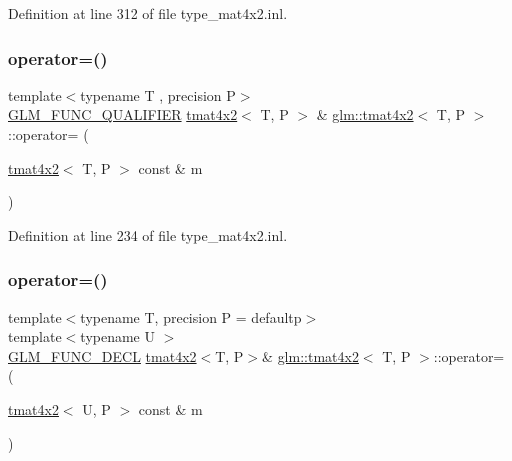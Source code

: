 Definition at line 312 of file type\+\_\+mat4x2.\+inl.

\mbox{\label{structglm_1_1tmat4x2_a46c78cffbef2b6300349830a76cb6372}} 
\subsubsection{\texorpdfstring{operator=()}{operator=()}\hspace{0.1cm}{\footnotesize\ttfamily [1/3]}}
{\footnotesize\ttfamily template$<$typename T , precision P$>$ \\
\mbox{\hyperlink{setup_8hpp_a33fdea6f91c5f834105f7415e2a64407}{G\+L\+M\+\_\+\+F\+U\+N\+C\+\_\+\+Q\+U\+A\+L\+I\+F\+I\+ER}} \mbox{\hyperlink{structglm_1_1tmat4x2}{tmat4x2}}$<$ T, P $>$ \& \mbox{\hyperlink{structglm_1_1tmat4x2}{glm\+::tmat4x2}}$<$ T, P $>$\+::operator= (\begin{DoxyParamCaption}\item[{\mbox{\hyperlink{structglm_1_1tmat4x2}{tmat4x2}}$<$ T, P $>$ const \&}]{m }\end{DoxyParamCaption})}



Definition at line 234 of file type\+\_\+mat4x2.\+inl.

\mbox{\label{structglm_1_1tmat4x2_adee2eef61ff69e7b17d001ae682e1a75}} 
\subsubsection{\texorpdfstring{operator=()}{operator=()}\hspace{0.1cm}{\footnotesize\ttfamily [2/3]}}
{\footnotesize\ttfamily template$<$typename T, precision P = defaultp$>$ \\
template$<$typename U $>$ \\
\mbox{\hyperlink{setup_8hpp_ab2d052de21a70539923e9bcbf6e83a51}{G\+L\+M\+\_\+\+F\+U\+N\+C\+\_\+\+D\+E\+CL}} \mbox{\hyperlink{structglm_1_1tmat4x2}{tmat4x2}}$<$T, P$>$\& \mbox{\hyperlink{structglm_1_1tmat4x2}{glm\+::tmat4x2}}$<$ T, P $>$\+::operator= (\begin{DoxyParamCaption}\item[{\mbox{\hyperlink{structglm_1_1tmat4x2}{tmat4x2}}$<$ U, P $>$ const \&}]{m }\end{DoxyParamCaption})}

